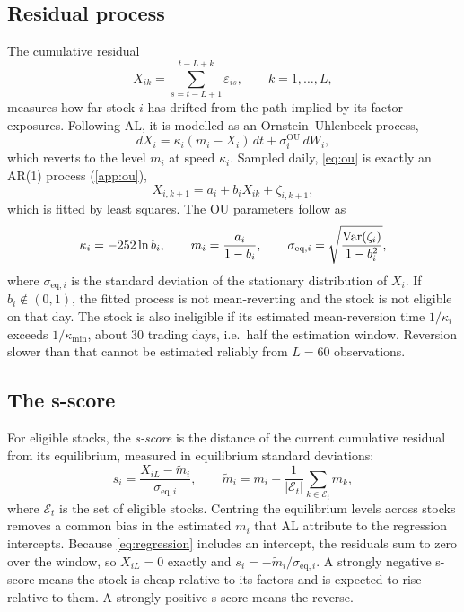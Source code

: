 \subsection{Residual process}
\label{sec:method:ou}

The cumulative residual
\begin{equation}
  X_{ik} = \sum_{s=t-L+1}^{t-L+k} \varepsilon_{is}, \qquad k = 1,\dots,L,
\end{equation}
measures how far stock $i$ has drifted from the path implied by its factor exposures. Following
AL, it is modelled as an Ornstein--Uhlenbeck process,
\begin{equation}
  dX_i = \kappa_i (m_i - X_i)\, dt + \sigma_i^{\text{OU}}\, dW_i ,
  \label{eq:ou}
\end{equation}
which reverts to the level $m_i$ at speed $\kappa_i$. Sampled daily, \cref{eq:ou} is exactly an
AR(1) process (\cref{app:ou}),
\begin{equation}
  X_{i,k+1} = a_i + b_i X_{ik} + \zeta_{i,k+1},
  \label{eq:ar1}
\end{equation}
which is fitted by least squares. The OU parameters follow as
\begin{equation}
  \kappa_i = -252 \ln b_i, \qquad
  m_i = \frac{a_i}{1-b_i}, \qquad
  \sigma_{\text{eq},i} = \sqrt{\frac{\operatorname{Var}(\zeta_i)}{1-b_i^2}},
  \label{eq:ou-params}
\end{equation}
where $\sigma_{\text{eq},i}$ is the standard deviation of the stationary distribution of
$X_i$. If $b_i \notin (0,1)$, the fitted process is not mean-reverting and the stock is not
eligible on that day. The stock is also ineligible if its estimated mean-reversion time
$1/\kappa_i$ exceeds $1/\kappa_{\min}$, about 30 trading days, i.e.\ half the estimation window.
Reversion slower than that cannot be estimated reliably from $L=60$ observations.

\subsection{The s-score}
\label{sec:method:sscore}

For eligible stocks, the \emph{s-score} is the distance of the current cumulative residual from
its equilibrium, measured in equilibrium standard deviations:
\begin{equation}
  s_i = \frac{X_{iL} - \tilde m_i}{\sigma_{\text{eq},i}}, \qquad
  \tilde m_i = m_i - \frac{1}{|\mathcal E_t|}\sum_{k \in \mathcal E_t} m_k ,
  \label{eq:sscore}
\end{equation}
where $\mathcal E_t$ is the set of eligible stocks. Centring the equilibrium levels across
stocks removes a common bias in the estimated $m_i$ that AL attribute to the regression
intercepts. Because \cref{eq:regression} includes an intercept, the residuals sum to zero over
the window, so $X_{iL} = 0$ exactly and $s_i = -\tilde m_i/\sigma_{\text{eq},i}$. A strongly
negative s-score means the stock is cheap relative to its factors and is expected to rise
relative to them. A strongly positive s-score means the reverse.


